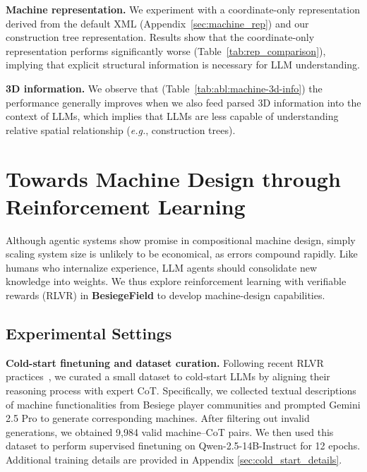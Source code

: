 \documentclass{article} %
\makeatletter
\newcommand*{\eg}{{\it e.g.}\@\xspace}
\newcommand{\envname}{\textbf{BesiegeField}\xspace}
\theoremstyle{plain}
\theoremstyle{definition}
\makeatother
\begin{document}
\textbf{Machine representation.} We experiment with a coordinate-only representation derived from the default XML (Appendix~\ref{sec:machine_rep}) and our construction tree representation. Results show that the coordinate-only representation performs significantly worse (Table~\ref{tab:rep_comparison}), implying that explicit structural information is necessary for LLM understanding.

\textbf{3D information.} 
We observe that (Table~\ref{tab:abl:machine-3d-info}) the performance generally improves when we also feed parsed 3D information into the context of LLMs, which implies that LLMs are less capable of understanding relative spatial relationship (\eg, construction trees).


\vspace{-2mm}
\section{Towards Machine Design through Reinforcement Learning}
\vspace{-2mm}

Although agentic systems show promise in compositional machine design, simply scaling system size is unlikely to be economical, as errors compound rapidly. Like humans who internalize experience, LLM agents should consolidate new knowledge into weights. We thus explore reinforcement learning with verifiable rewards (RLVR) in \envname to develop machine-design capabilities.

\vspace{-2mm}
\subsection{Experimental Settings}\label{sec: setting}
\vspace{-1.5mm}


\textbf{Cold-start finetuning and dataset curation.} Following recent RLVR practices~\citep{lambert2024tulu,yue2025does,zhu2025surprising}, we curated a small dataset to cold-start LLMs by aligning their reasoning process with expert CoT. Specifically, we collected textual descriptions of machine functionalities from Besiege player communities and prompted Gemini 2.5 Pro to generate corresponding machines. After filtering out invalid generations, we obtained 9,984 valid machine–CoT pairs. We then used this dataset to perform supervised finetuning on Qwen-2.5-14B-Instruct for 12 epochs. Additional training details are provided in Appendix \ref{sec:cold_start_details}.
\end{document}
